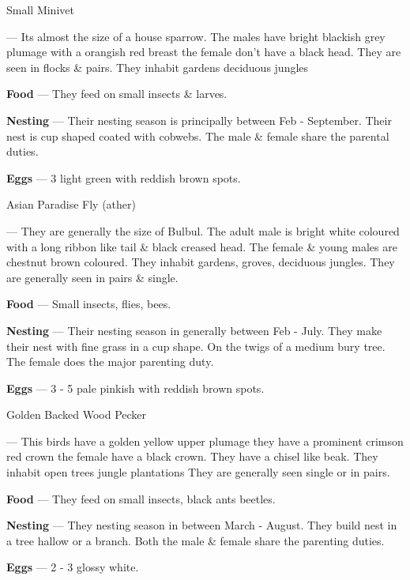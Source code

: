 \begin{bird}{Small Minivet}

 --- Its almost the size of a house sparrow. The males have bright blackish grey plumage with a orangish red breast the female don't have a black head. They are seen in flocks \& pairs. They inhabit gardens deciduous jungles

{\large\bf Food} --- They feed on small insects \& larves.

{\large\bf Nesting} --- Their nesting season is principally between Feb - September. Their nest is cup shaped coated with cobwebs. The male \& female share the parental duties.

{\large\bf Eggs} --- 3 light green with reddish brown spots.
\end{bird}

\newpage

\begin{bird}{Asian Paradise Fly (ather)}

 --- They are generally the size of Bulbul. The adult male is bright white coloured with a long ribbon like tail \& black creased head. The female \& young males are chestnut brown coloured. They inhabit gardens, groves, deciduous jungles. They are generally seen in pairs \& single. 

{\large\bf Food} --- Small insects, flies, bees.

{\large\bf Nesting} --- Their nesting season in generally between Feb - July. They make their nest with fine grass in a cup shape. On the twigs of a medium bury tree. The female does the major parenting duty.

{\large\bf Eggs} --- 3 - 5 pale pinkish with reddish brown spots. 
\end{bird}

\begin{bird}{Golden Backed Wood Pecker}

 --- This birds have a golden yellow upper plumage they have a prominent crimson red crown the female have a black crown. They have a chisel like beak. They inhabit open trees jungle plantations They are generally seen single or in pairs.

{\large\bf Food} --- They feed on small insects, black ants beetles.

{\large\bf Nesting} --- They nesting season in between March - August. They build nest in a tree hallow or a branch. Both the male \& female share the parenting duties.

{\large\bf Eggs} --- 2 - 3 glossy white.
\end{bird}

